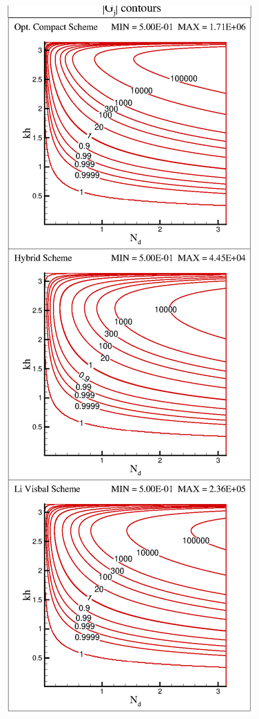 \documentclass{svjour3}                    %
\begin{document}
\begin{figure}[h!]
\center
\includegraphics[scale=0.380]{Fig_7a}

\end{figure}
\end{document}
